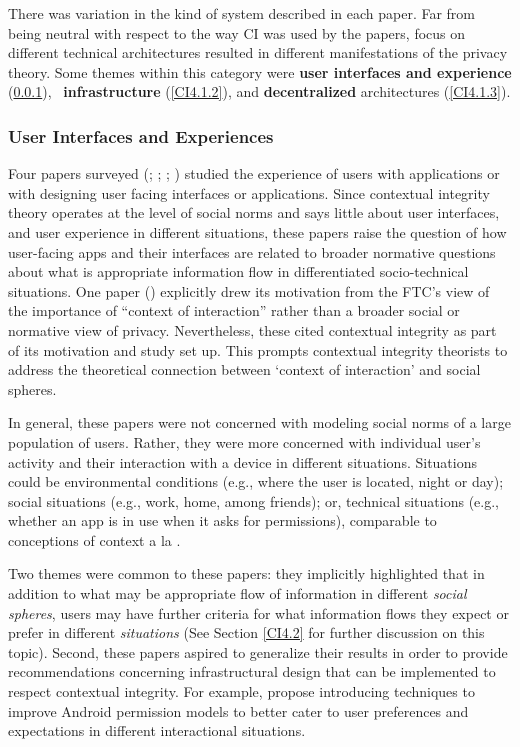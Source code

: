 \documentclass[../thesis.tex]{subfiles}
\begin{document}
There was variation in the kind of system
described in each paper. Far from being neutral with respect to the way
CI was used by the papers, focus on different technical architectures
resulted in different manifestations of the privacy theory. Some
themes within this category were \textbf{user interfaces and experience
}(\ref{CI4.1.1}), \ \textbf{infrastructure }(\ref{CI4.1.2}),
and \textbf{decentralized} architectures (\ref{CI4.1.3}).

\subsubsection{User Interfaces and Experiences}
\label{CI4.1.1}

Four papers surveyed (\citet{shih2010towards};
\citet{shih2015privacy}; \citet{zhang2013no};
\citet{wijesekera2015android}) studied the experience of users
with applications or with designing user facing interfaces or
applications. Since contextual integrity theory operates at the level
of social norms and says little about user interfaces, and user
experience in different situations, these papers raise the question of
how user-facing apps and their interfaces are related to broader
normative questions about what is appropriate information flow in
differentiated socio-technical situations. One paper
(\citet{zhang2013no}) explicitly drew its motivation from
the FTC's view of the importance of
``context of interaction'' rather
than a broader social or normative view of privacy. Nevertheless, these
cited contextual integrity as part of its motivation and study set up.
This prompts contextual integrity theorists to address the theoretical
connection between `context of
interaction' and social spheres.

In general, these papers were not concerned with modeling social norms
of a large population of users. Rather, they were more concerned with
individual user's activity and their interaction with a
device in different situations. Situations could be environmental
conditions (e.g., where the user is located, night or day); social
situations (e.g., work, home, among friends); or, technical situations
(e.g., whether an app is in use when it asks for permissions),
comparable to conceptions of context a la \citet{dey2001conceptual}.

Two themes were common to these papers: they implicitly highlighted that
in addition to what may be appropriate flow of information in different
\textit{social spheres}, users may have further criteria for what
information flows they expect or prefer in different
\textit{situations} (See Section \ref{CI4.2} for further discussion on this
topic). Second, these papers aspired to generalize their results in
order to provide recommendations concerning infrastructural design that
can be implemented to respect contextual integrity. For example,
\citet{wijesekera2015android} propose
introducing techniques to improve Android permission models to better
cater to user preferences and expectations in different interactional
situations.
\end{document}
